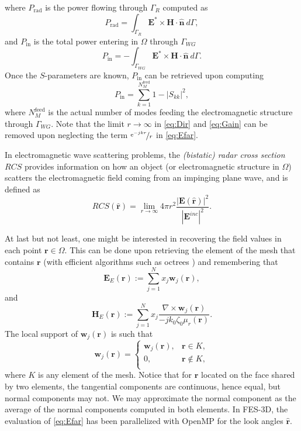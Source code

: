 %
\noindent where $P_\mathrm{rad}$ is the power flowing through $\Gamma_R$ computed as
$$P_\mathrm{rad} = \int_{\Gamma_R} \mathbf{E}^*\times\mathbf{H} \cdot \hat{\mathbf{n}} \ d\Gamma,$$
\noindent and $P_\mathrm{in}$ is the total power entering in $\Omega$ through $\Gamma_{WG}$
$$P_\mathrm{in} = - \int_{\Gamma_{WG}} \mathbf{E}^*\times\mathbf{H} \cdot \hat{\mathbf{n}} \ d\Gamma.$$
\noindent Once the $S$-parameters are known, $P_\mathrm{in}$ can be retrieved upon computing
$$P_\mathrm{in} = \sum_{k=1}^{N_{M}^\mathrm{feed}} 1-|S_{kk}|^2,$$
\noindent where $N_{M}^\mathrm{feed}$ is the actual number of modes feeding the electromagnetic structure through $\Gamma_{WG}$. Note that the limit ${r\to\infty}$ in \eqref{eq:Dir} and \eqref{eq:Gain} can be removed upon neglecting the term $\nicefrac{\mathrm{e}^{-jkr}}{r}$ in \eqref{eq:Efar}.

In electromagnetic wave scattering problems, the \textit{(bistatic) radar cross section} $RCS$ provides information on how an object (or electromagnetic structure in $\Omega$) scatters the electromagnetic field coming from an impinging plane wave, and is defined as
\begin{equation}
\label{eq:RCS}
RCS (\hat{\mathbf{r}}) = \lim_{r\to\infty} 4 \pi r^2 \frac{|\mathbf{E}(\hat{\mathbf{r}})|^2}{|\mathbf{E}^{inc}|^2}.
\end{equation}

At last but not least, one might be interested in recovering the field values in each point $\mathbf{r} \in \Omega$. This can be done upon retrieving the element of the mesh that contains $\mathbf{r}$ (with efficient algorithms such as octrees \cite{szeliski1993rapid}) and remembering that
$$\mathbf{E}_E(\mathbf{r}) := \sum_{j=1}^{N} x_j \mathbf{w}_j(\mathbf{r}),$$
\noindent and 
$$\mathbf{H}_E(\mathbf{r}) := \sum_{j=1}^{N} x_j \frac{\nabla \times \mathbf{w}_j(\mathbf{r})}{-j k_0\zeta_0\mu_r(\mathbf{r})}.$$
%
\noindent The local support of $\mathbf{w}_j(\mathbf{r})$ is such that 
\begin{equation}
\mathbf{w}_j(\mathbf{r}) = \left\lbrace
\begin{array}{cc}
\mathbf{w}_j(\mathbf{r}), & \mathbf{r} \in K,\\
0, & \mathbf{r} \not\in K,\\
\end{array}
\right.
\end{equation}
\noindent where $K$ is any element of the mesh.
Notice that for $\mathbf{r}$ located on the face shared by two elements, the tangential components are continuous, hence equal, but normal components may not. We may approximate the normal component as the average of the normal components computed in both elements. In FES-3D, the evaluation of \eqref{eq:Efar} has been parallelized with OpenMP for the look angles $\hat{\mathbf{r}}$. 

